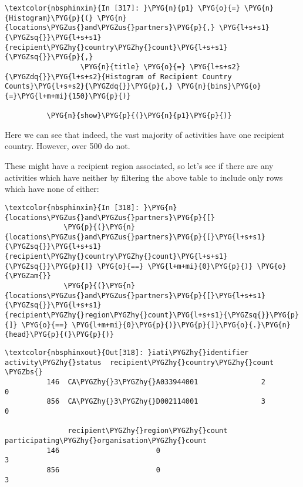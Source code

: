 \documentclass[letterpaper,10pt,english]{sphinxmanual}
\begin{document}
\begin{Verbatim}[commandchars=\\\{\}]
\textcolor{nbsphinxin}{In [317]: }\PYG{n}{p1} \PYG{o}{=} \PYG{n}{Histogram}\PYG{p}{(} \PYG{n}{locations\PYGZus{}and\PYGZus{}partners}\PYG{p}{,} \PYG{l+s+s1}{\PYGZsq{}}\PYG{l+s+s1}{recipient\PYGZhy{}country\PYGZhy{}count}\PYG{l+s+s1}{\PYGZsq{}}\PYG{p}{,}
                  \PYG{n}{title} \PYG{o}{=} \PYG{l+s+s2}{\PYGZdq{}}\PYG{l+s+s2}{Histogram of Recipient Country Counts}\PYG{l+s+s2}{\PYGZdq{}}\PYG{p}{,} \PYG{n}{bins}\PYG{o}{=}\PYG{l+m+mi}{150}\PYG{p}{)}
          
          \PYG{n}{show}\PYG{p}{(}\PYG{n}{p1}\PYG{p}{)}
\end{Verbatim}

Here we can see that indeed, the vast majority of activities have one
recipient country. However, over 500 do not.

These might have a recipient region associated, so let's see if there
are any activities which have neither by filtering the above table to
include only rows which have none of either:

\begin{Verbatim}[commandchars=\\\{\}]
\textcolor{nbsphinxin}{In [318]: }\PYG{n}{locations\PYGZus{}and\PYGZus{}partners}\PYG{p}{[}
              \PYG{p}{(}\PYG{n}{locations\PYGZus{}and\PYGZus{}partners}\PYG{p}{[}\PYG{l+s+s1}{\PYGZsq{}}\PYG{l+s+s1}{recipient\PYGZhy{}country\PYGZhy{}count}\PYG{l+s+s1}{\PYGZsq{}}\PYG{p}{]} \PYG{o}{==} \PYG{l+m+mi}{0}\PYG{p}{)} \PYG{o}{\PYGZam{}}
              \PYG{p}{(}\PYG{n}{locations\PYGZus{}and\PYGZus{}partners}\PYG{p}{[}\PYG{l+s+s1}{\PYGZsq{}}\PYG{l+s+s1}{recipient\PYGZhy{}region\PYGZhy{}count}\PYG{l+s+s1}{\PYGZsq{}}\PYG{p}{]} \PYG{o}{==} \PYG{l+m+mi}{0}\PYG{p}{)}\PYG{p}{]}\PYG{o}{.}\PYG{n}{head}\PYG{p}{(}\PYG{p}{)}
\end{Verbatim}

\begin{Verbatim}[commandchars=\\\{\}]
\textcolor{nbsphinxout}{Out[318]: }iati\PYGZhy{}identifier activity\PYGZhy{}status  recipient\PYGZhy{}country\PYGZhy{}count  \PYGZbs{}
          146  CA\PYGZhy{}3\PYGZhy{}A033944001               2                        0
          856  CA\PYGZhy{}3\PYGZhy{}D002114001               3                        0
          
               recipient\PYGZhy{}region\PYGZhy{}count  participating\PYGZhy{}organisation\PYGZhy{}count
          146                       0                                 3
          856                       0                                 3
\end{Verbatim}
\end{document}
